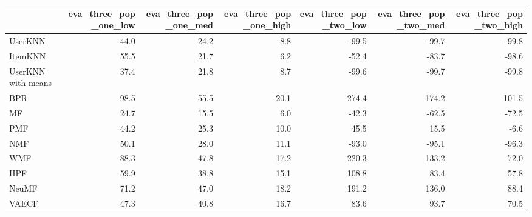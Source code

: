 \begin{tabular}{lrrrrrr}
\toprule
{} &  eva\_three\_pop\_one\_low &  eva\_three\_pop\_one\_med &  eva\_three\_pop\_one\_high &  eva\_three\_pop\_two\_low &  eva\_three\_pop\_two\_med &  eva\_three\_pop\_two\_high \\
\midrule
UserKNN            &                   44.0 &                   24.2 &                     8.8 &                  -99.5 &                  -99.7 &                   -99.8 \\
ItemKNN            &                   55.5 &                   21.7 &                     6.2 &                  -52.4 &                  -83.7 &                   -98.6 \\
UserKNN with means &                   37.4 &                   21.8 &                     8.7 &                  -99.6 &                  -99.7 &                   -99.8 \\
BPR                &                   98.5 &                   55.5 &                    20.1 &                  274.4 &                  174.2 &                   101.5 \\
MF                 &                   24.7 &                   15.5 &                     6.0 &                  -42.3 &                  -62.5 &                   -72.5 \\
PMF                &                   44.2 &                   25.3 &                    10.0 &                   45.5 &                   15.5 &                    -6.6 \\
NMF                &                   50.1 &                   28.0 &                    11.1 &                  -93.0 &                  -95.1 &                   -96.3 \\
WMF                &                   88.3 &                   47.8 &                    17.2 &                  220.3 &                  133.2 &                    72.0 \\
HPF                &                   59.9 &                   38.8 &                    15.1 &                  108.8 &                   83.4 &                    57.8 \\
NeuMF              &                   71.2 &                   47.0 &                    18.2 &                  191.2 &                  136.0 &                    88.4 \\
VAECF              &                   47.3 &                   40.8 &                    16.7 &                   83.6 &                   93.7 &                    70.5 \\
\bottomrule
\end{tabular}
